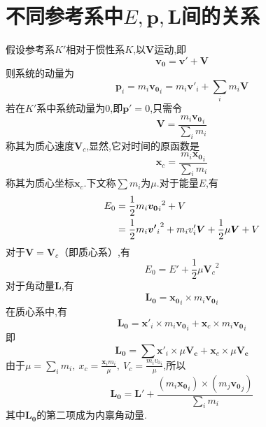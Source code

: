 \section{不同参考系中$E,\boldsymbol{p},\boldsymbol{L}$间的关系}
假设参考系$K'$相对于惯性系$K$,以$\boldsymbol{V}$运动,即
\begin{equation}
\boldsymbol{v_0} = \boldsymbol{v'} + \boldsymbol{V}
\end{equation}
则系统的动量为
\begin{equation}
\boldsymbol{p}_i = m_i \boldsymbol{v_0}_i = m_i\boldsymbol{v'}_i + \sum_{i}m_i\boldsymbol{V}
\end{equation}
若在$K'$系中系统动量为0,即$\boldsymbol{p'}=0$,只需令
\begin{equation}
\boldsymbol{V} = \frac{m_i\boldsymbol{v_0}_i}{\sum_{i}m_i}
\end{equation}
称其为质心速度$\boldsymbol{V}_c$,显然,它对时间的原函数是
\begin{equation}
\boldsymbol{x}_c = \frac{m_i\boldsymbol{x_0}_i}{\sum_{i}m_i}
\end{equation}
称其为质心坐标$\boldsymbol{x}_c$.下文称$\sum m_i$为$\mu$.对于能量$E$,有
\begin{align}
E_0 = {} & \frac{1}{2}m_i{\boldsymbol{v_0}_i}^2 + V \notag \\
= {} & \frac{1}{2}m_i{\boldsymbol{v'}_i}^2 + m_i v'_i \boldsymbol{V} + \frac{1}{2}\mu\boldsymbol{V} + V
\end{align}
对于$\boldsymbol{V} = \boldsymbol{V}_c$（即质心系）,有
\begin{equation}
E_0 = E' + \frac{1}{2}\mu{\boldsymbol{V}_c}^2
\end{equation}
对于角动量$\boldsymbol{L}$,有
\begin{equation}
\boldsymbol{L_0} = \boldsymbol{x_0}_i \times m_i \boldsymbol{v_0}_i
\end{equation}
在质心系中,有
\begin{equation}
\boldsymbol{L_0} = \boldsymbol{x'}_i \times m_i \boldsymbol{v_0}_i + \boldsymbol{x}_c \times m_i \boldsymbol{v_0}_i
\end{equation}
即
\begin{equation}
\boldsymbol{L_0} = \sum\boldsymbol{x'}_i \times \mu\boldsymbol{V_c} + \boldsymbol{x}_c \times \mu\boldsymbol{V_c}
\end{equation}
由于$\mu=\sum_{i}m_i,\ x_c=\frac{\boldsymbol{x}_i m_i}{\mu},\ V_c=\frac{m_i {v_0}_i}{\mu}$,所以
\begin{equation}
\boldsymbol{L_0} = \boldsymbol{L}' + \frac{(m_i \boldsymbol{x_0}_i)\times (m_j \boldsymbol{v_0}_j)}{\sum_{i}m_i}
\end{equation}
其中$\boldsymbol{L_0}$的第二项成为内禀角动量.

